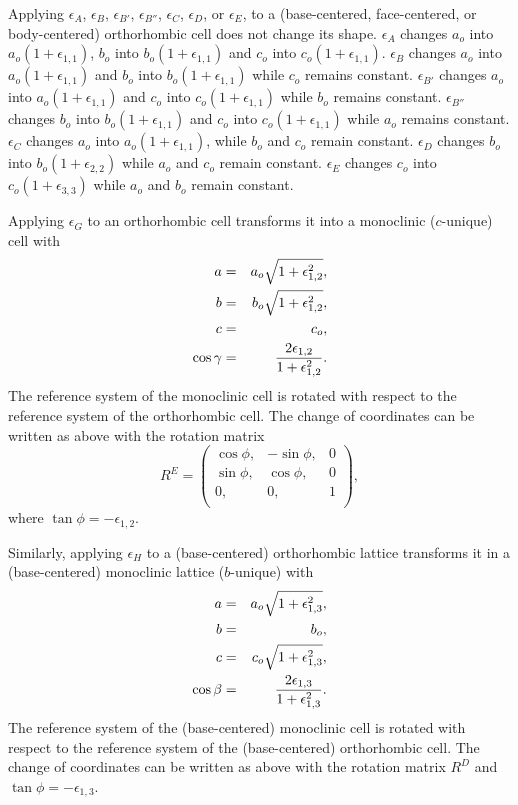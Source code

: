 \documentclass[12pt,a4paper,twoside]{report}
\begin{document}
Applying $\epsilon_A$, $\epsilon_B$, $\epsilon_{B'}$, $\epsilon_{B''}$, 
$\epsilon_C$, $\epsilon_D$, or $\epsilon_E$, to a (base-centered, 
face-centered, or body-centered) orthorhombic cell does not change its shape. 
$\epsilon_A$ changes $a_o$ into $a_o(1+\epsilon_{1,1})$, $b_o$ into
$b_o(1+\epsilon_{1,1})$ and $c_o$ into $c_o(1+\epsilon_{1,1})$.
$\epsilon_B$ changes $a_o$ into $a_o(1+\epsilon_{1,1})$ and $b_o$ into
$b_o(1+\epsilon_{1,1})$ while $c_o$ remains constant.
$\epsilon_{B'}$ changes $a_o$ into $a_o(1+\epsilon_{1,1})$ and $c_o$ into
$c_o(1+\epsilon_{1,1})$ while $b_o$ remains constant.
$\epsilon_{B''}$ changes $b_o$ into $b_o(1+\epsilon_{1,1})$ and $c_o$ into
$c_o(1+\epsilon_{1,1})$ while $a_o$ remains constant.
$\epsilon_C$ changes $a_o$ into 
$a_o(1+\epsilon_{1,1})$, while $b_o$ and $c_o$ remain constant.
$\epsilon_D$ changes $b_o$ into $b_o(1+\epsilon_{2,2})$ while
$a_o$ and $c_o$ remain constant.
$\epsilon_E$ changes $c_o$ into $c_o(1+\epsilon_{3,3})$ while $a_o$ and
$b_o$ remain constant.

Applying $\epsilon_G$ to an orthorhombic cell transforms it into a 
monoclinic ($c$-unique) cell with
\begin{eqnarray}
a&=&a_o \sqrt{1+\epsilon_{1,2}^2}, \\
b&=&b_o \sqrt{1+\epsilon_{1,2}^2}, \\
c&=&c_o, \\
\cos\gamma &=& {2 \epsilon_{1,2} \over 1 + \epsilon_{1,2}^2}.
\end{eqnarray}
The reference system of the monoclinic cell is rotated with respect to
the reference system of the orthorhombic cell. 
The change of coordinates can be written as above with the rotation matrix 
\begin{equation}
R^E=\left( \begin{array}{ccc}
\cos\phi, & -\sin\phi, & 0 \\
\sin\phi, &  \cos\phi, & 0 \\
0, & 0, & 1 \\
\end{array}
\right),
\end{equation}
where $\tan \phi=-\epsilon_{1,2}$.

Similarly, applying $\epsilon_H$ to a (base-centered) 
orthorhombic lattice transforms
it in a (base-centered) monoclinic lattice ($b$-unique) with 
\begin{eqnarray}
a&=&a_o \sqrt{1+\epsilon_{1,3}^2}, \\
b&=&b_o, \\
c&=&c_o \sqrt{1+\epsilon_{1,3}^2}, \\
\cos\beta &=& {2 \epsilon_{1,3} \over 1 + \epsilon_{1,3}^2}. 
\end{eqnarray}
The reference system of the (base-centered) monoclinic cell is 
rotated with respect to the reference system of the (base-centered) 
orthorhombic cell. 
The change of coordinates can be written as above with the rotation matrix 
$R^D$ and $\tan \phi=-\epsilon_{1,3}$.
\end{document}

